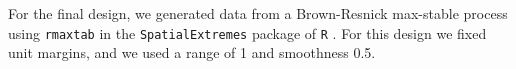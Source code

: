 For the final design, we generated data from a Brown-Resnick max-stable process  using \texttt{rmaxtab} in the \texttt{SpatialExtremes} package of \texttt{R} \citep{Ribatet2015}.
For this design we fixed unit \Frechet margins, and we used a range of 1 and smoothness 0.5.

